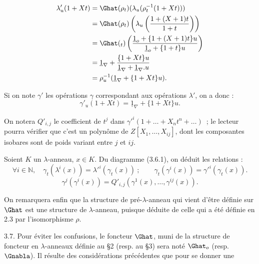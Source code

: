 
\[
\begin{aligned}
\lambda'_u(1+Xt) &=\Ghat(\rho_t)(\lambda_u(\rho_t^{-1}(1+Xt)))\\
&=\Ghat(\rho_t)\left(\lambda_u\left(\frac{1+(X+1)t}{1+t}\right)\right)\\
&=\Ghat({}_t)\left(\frac{\underline{1}_o+\{1+(X+1)t\}u}{\underline{1}_o+\{1+t\}u}\right)\\
&=\underline{1}_\nabla+\frac{\{1+Xt\}u}{\underline{1}_\nabla+\underline{1}_\nabla.u}\\
&=\rho_u^{-1}(\underline{1}_\nabla+\{1+Xt\}u).
\end{aligned}
\]

Si on note \(\gamma'\) les opérations \(\gamma\) correspondant aux opérations \(\lambda'\), on a donc :
\begin{equation}\tag{3.6.2}
  \gamma'_u(1+Xt)=\underline{1}_\nabla+\{1+Xt\}u .
\end{equation}

On notera \(Q'_{i,j}\) le coefficient de \(t^j\) dans \(\gamma'^i(1+\ldots+X_nt^n+\ldots)\)~; le lecteur pourra vérifier que c'est un polynôme de \(Z[X_1,\ldots,X_{ij}]\), dont les composantes isobares sont de poids variant entre \(j\) et \(ij\).

Soient \(K\) un \(\lambda\)-anneau, \(x\in K\). Du diagramme (3.6.1), on déduit les relations :
\begin{equation}\tag{3.6.3}
  \forall i\in\mathbb N,\quad\gamma_t(\lambda^i(x))=\lambda'^i(\gamma_t(x))~;
  \qquad
  \gamma_t(\gamma^i(x))=\gamma'^i(\gamma_t(x)).
\end{equation}
\begin{equation}\tag{3.6.4}
  \gamma^j(\gamma^i(x))
  =Q'_{i,j}(\gamma^1(x),\ldots,\gamma^{ij}(x)).
\end{equation}

On remarquera enfin que la structure de pré-\(\lambda\)-anneau qui vient d'être définie sur \(\Ghat\) est une structure de \(\lambda\)-anneau, puisque déduite de celle qui a été définie en 2.3 par l'isomorphisme \(\rho\).

3.7. Pour éviter les confusions, le foncteur \(\Ghat\), muni de la structure de foncteur en \(\lambda\)-anneaux définie au §2 (resp. au §3) sera noté \(\Ghat_o\) (resp. \(\Gnabla\)). Il résulte des considérations précédentes que pour se donner une
